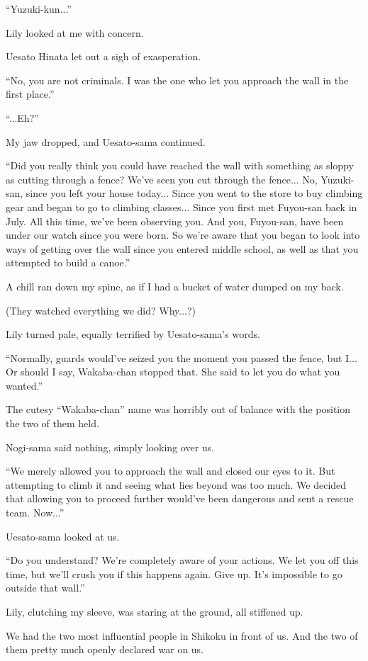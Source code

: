 ``Yuzuki-kun...''

Lily looked at me with concern.

Uesato Hinata let out a sigh of exasperation.

``No, you are not criminals. I was the one who let you approach the wall in the first place.''

``...Eh?''

My jaw dropped, and Uesato-sama continued.

``Did you really think you could have reached the wall with something as sloppy as cutting through a fence? We've seen you cut through the fence... No, Yuzuki-san, since you left your house today... Since you went to the store to buy climbing gear and began to go to climbing classes... Since you first met Fuyou-san back in July. All this time, we've been observing you. And you, Fuyou-san, have been under our watch since you were born. So we're aware that you began to look into ways of getting over the wall since you entered middle school, as well as that you attempted to build a canoe.''

A chill ran down my spine, as if I had a bucket of water dumped on my back.

(They watched everything we did? Why...?)

Lily turned pale, equally terrified by Uesato-sama's words.

``Normally, guards would've seized you the moment you passed the fence, but I... Or should I say, Wakaba-chan stopped that. She said to let you do what you wanted.''

The cutesy ``Wakaba-chan'' name was horribly out of balance with the position the two of them held.

Nogi-sama said nothing, simply looking over us.

``We merely allowed you to approach the wall and closed our eyes to it. But attempting to climb it and seeing what lies beyond was too much. We decided that allowing you to proceed further would've been dangerous and sent a rescue team. Now...''

Uesato-sama looked at us.

``Do you understand? We're completely aware of your actions. We let you off this time, but we'll crush you if this happens again. Give up. It's impossible to go outside that wall.''

Lily, clutching my sleeve, was staring at the ground, all stiffened up.

We had the two most influential people in Shikoku in front of us. And the two of them pretty much openly declared war on us.

